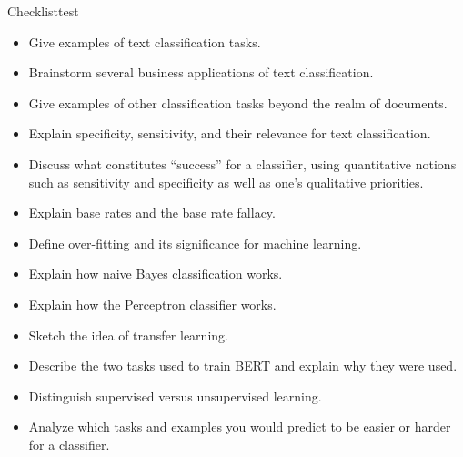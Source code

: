 \begin{tblsfilledsymbol}{Checklist}{test}

\begin{itemize}
\item Give examples of text classification tasks.  
\item Brainstorm several business applications of text classification.
\item Give examples of other classification tasks beyond the realm of documents.
\item Explain specificity, sensitivity, and their relevance for text classification.
\item Discuss what constitutes ``success'' for a classifier, using quantitative notions such as sensitivity and specificity as well as  one's qualitative priorities.
\item Explain base rates and the base rate fallacy.
\item Define over-fitting and its significance for machine learning.
\item Explain how naive Bayes classification works.
\item Explain how the Perceptron classifier works.
\item Sketch the idea of transfer learning.  
\item Describe the two tasks used to train BERT and explain why they were used.
\item Distinguish supervised versus unsupervised learning.
\item Analyze which tasks and examples you would predict to be easier or harder for a classifier. 
\end{itemize}
\end{tblsfilledsymbol}



